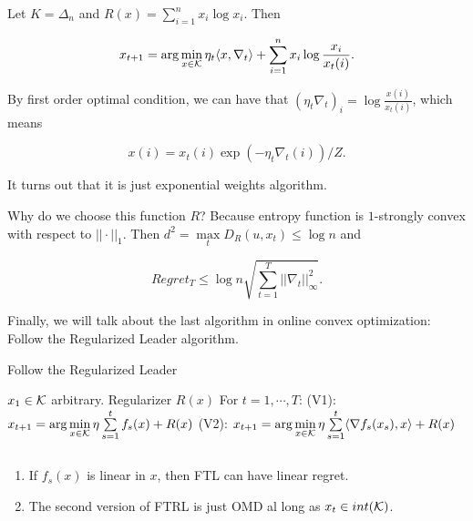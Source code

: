 \documentclass[../main.tex]{subfiles}
\begin{document}
\begin{example}
	Let $K = \Delta_n$ and $R(x) = \sum\limits_{i=1}^n x_i \log x_i$. Then
	
	\begin{equation*}
	x_{t+1} = \arg\min\limits_{x\in \mathcal{K}} \eta_t \langle x, \nabla_t \rangle + \sum\limits_{i=1}^n x_i \log \frac{x_i}{x_t(i)}.
	\end{equation*}
	
	By first order optimal condition, we can have that $(\eta_t \nabla_t)_i = \log\frac{x(i)}{x_t(i)}$, which means 
	
	\begin{equation*}
	x(i) = x_t(i) \exp(-\eta_t \nabla_t(i)) /Z.
	\end{equation*}
	
	It turns out that it is just exponential weights algorithm.
	
	Why do we choose this function $R$? Because entropy function is $1$-strongly convex with respect to $||\cdot||_1$. Then $d^2 = \max\limits_{t} D_R (u,x_t) \leq \log n$ and 
	
	\begin{equation*}
		Regret_T \leq \log n \sqrt{\sum\limits_{t=1}^T ||\nabla_t||^2_{\infty}}.
	\end{equation*}
\end{example}

Finally, we will talk about the last algorithm in online convex optimization: Follow the Regularized Leader algorithm.


\begin{algorithm}[H]
	\caption{Follow the Regularized Leader}
	\begin{algorithmic}
		\STATE $x_1 \in \mathcal{K}$ arbitrary.
		\STATE Regularizer $R(x)$
		\STATE For $t = 1,\cdots ,T$:
		\bindent 
		\STATE (V1): $x_{t+1} = \arg\min\limits_{x\in \mathcal{K}} \eta \sum\limits_{s=1}^t f_s(x) + R(x)$
		\STATE (V2): $x_{t+1} = \arg\min\limits_{x\in \mathcal{K}}  \eta \sum\limits_{s=1}^t \langle \nabla f_s (x_s), x \rangle + R(x)$
		\eindent
	\end{algorithmic}
\end{algorithm}

\begin{fact}$ $
	\begin{enumerate}
		\item If $f_s(x)$ is linear in $x$, then FTL can have linear regret.
		\item The second version of FTRL is just OMD al long as $x_t \in int(\mathcal{K})$.
	\end{enumerate}
\end{fact}
\end{document}
